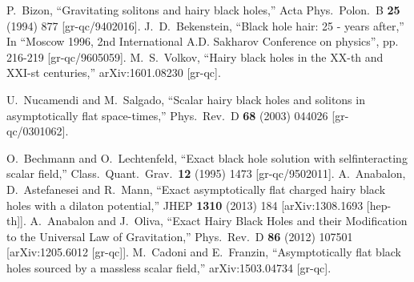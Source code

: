 \documentclass{article}
\numberwithin{equation}{section}
\begin{document}
\begin{small}
\begin{thebibliography}{99}
  P.~Bizon,
  ``Gravitating solitons and hairy black holes,''
  Acta Phys.\ Polon.\ B {\bf 25} (1994) 877
  [gr-qc/9402016].
  J.~D.~Bekenstein,
  ``Black hole hair: 25 - years after,''
  In "`Moscow 1996, 2nd International A.D. Sakharov Conference on physics"', pp. 216-219
  [gr-qc/9605059].
  M.~S.~Volkov,
  ``Hairy black holes in the XX-th and XXI-st centuries,''
  arXiv:1601.08230 [gr-qc].
 
  U.~Nucamendi and M.~Salgado,
  ``Scalar hairy black holes and solitons in asymptotically flat space-times,''
  Phys.\ Rev.\ D {\bf 68} (2003) 044026
  [gr-qc/0301062].

  O.~Bechmann and O.~Lechtenfeld,
  ``Exact black hole solution with selfinteracting scalar field,''
  Class.\ Quant.\ Grav.\  {\bf 12} (1995) 1473
  [gr-qc/9502011].
  A.~Anabalon, D.~Astefanesei and R.~Mann,
  ``Exact asymptotically flat charged hairy black holes with a dilaton potential,''
  JHEP {\bf 1310} (2013) 184
  [arXiv:1308.1693 [hep-th]].
  A.~Anabalon and J.~Oliva,
  ``Exact Hairy Black Holes and their Modification to the Universal Law of Gravitation,''
  Phys.\ Rev.\ D {\bf 86} (2012) 107501
  [arXiv:1205.6012 [gr-qc]].
  M.~Cadoni and E.~Franzin,
  ``Asymptotically flat black holes sourced by a massless scalar field,''
  arXiv:1503.04734 [gr-qc].


\end{thebibliography}
\end{small}
\end{document}
